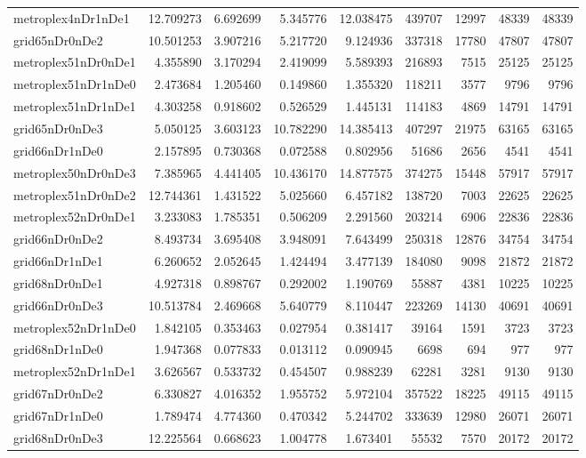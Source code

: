 \begin{longtable}{|l|r|r|r|r|r|r|r|r|}
metroplex4nDr1nDe1 & 12.709273 & 6.692699 & 5.345776 & 12.038475 & 439707 & 12997 & 48339 & 48339 \\
grid65nDr0nDe2 & 10.501253 & 3.907216 & 5.217720 & 9.124936 & 337318 & 17780 & 47807 & 47807 \\
metroplex51nDr0nDe1 & 4.355890 & 3.170294 & 2.419099 & 5.589393 & 216893 & 7515 & 25125 & 25125 \\
metroplex51nDr1nDe0 & 2.473684 & 1.205460 & 0.149860 & 1.355320 & 118211 & 3577 & 9796 & 9796 \\
metroplex51nDr1nDe1 & 4.303258 & 0.918602 & 0.526529 & 1.445131 & 114183 & 4869 & 14791 & 14791 \\
grid65nDr0nDe3 & 5.050125 & 3.603123 & 10.782290 & 14.385413 & 407297 & 21975 & 63165 & 63165 \\
grid66nDr1nDe0 & 2.157895 & 0.730368 & 0.072588 & 0.802956 & 51686 & 2656 & 4541 & 4541 \\
metroplex50nDr0nDe3 & 7.385965 & 4.441405 & 10.436170 & 14.877575 & 374275 & 15448 & 57917 & 57917 \\
metroplex51nDr0nDe2 & 12.744361 & 1.431522 & 5.025660 & 6.457182 & 138720 & 7003 & 22625 & 22625 \\
metroplex52nDr0nDe1 & 3.233083 & 1.785351 & 0.506209 & 2.291560 & 203214 & 6906 & 22836 & 22836 \\
grid66nDr0nDe2 & 8.493734 & 3.695408 & 3.948091 & 7.643499 & 250318 & 12876 & 34754 & 34754 \\
grid66nDr1nDe1 & 6.260652 & 2.052645 & 1.424494 & 3.477139 & 184080 & 9098 & 21872 & 21872 \\
grid68nDr0nDe1 & 4.927318 & 0.898767 & 0.292002 & 1.190769 & 55887 & 4381 & 10225 & 10225 \\
grid66nDr0nDe3 & 10.513784 & 2.469668 & 5.640779 & 8.110447 & 223269 & 14130 & 40691 & 40691 \\
metroplex52nDr1nDe0 & 1.842105 & 0.353463 & 0.027954 & 0.381417 & 39164 & 1591 & 3723 & 3723 \\
grid68nDr1nDe0 & 1.947368 & 0.077833 & 0.013112 & 0.090945 & 6698 & 694 & 977 & 977 \\
metroplex52nDr1nDe1 & 3.626567 & 0.533732 & 0.454507 & 0.988239 & 62281 & 3281 & 9130 & 9130 \\
grid67nDr0nDe2 & 6.330827 & 4.016352 & 1.955752 & 5.972104 & 357522 & 18225 & 49115 & 49115 \\
grid67nDr1nDe0 & 1.789474 & 4.774360 & 0.470342 & 5.244702 & 333639 & 12980 & 26071 & 26071 \\
grid68nDr0nDe3 & 12.225564 & 0.668623 & 1.004778 & 1.673401 & 55532 & 7570 & 20172 & 20172 \\

\end{longtable}
